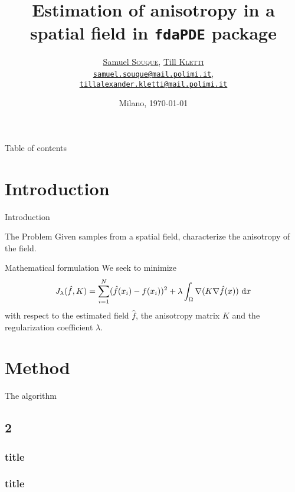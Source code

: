\documentclass[professionalfont]{beamer}
\title[Anisotropic \texttt{fdaPDE}]{Estimation of anisotropy in a spatial field in \texttt{fdaPDE} package}
\author[S. Souque \& T. Kletti]{\underline{Samuel \textsc{Souque}}, \underline{Till \textsc{Kletti}}\\
{\small \href{mailto:samuel.souque@mail.polimi.it}{\nolinkurl{samuel.souque@mail.polimi.it}}}, \\{\small \href{mailto:tillalexander.kletti@mail.polimi.it}{\nolinkurl{tillalexander.kletti@mail.polimi.it}}}}
\date[MI, today]{Milano, \today}
\institute[POLIMI]{Politecnico di Milano}
\begin{document}
\begin{frame}[plain]
\titlepage
\end{frame}

\begin{frame}{Table of contents}
\tableofcontents
\end{frame}

\section{Introduction}

\begin{frame}{Introduction}
\begin{block}{The Problem}
Given samples from a spatial field, characterize the anisotropy of the field.
\end{block}
\begin{block}{Mathematical formulation}
	We seek to minimize
	\begin{equation}
		J_\lambda(\hat{f},K) = \sum_{i=1}^N (\hat{f}(x_i)-f(x_i))^2 + \lambda\int_\Omega \nabla(K\nabla\hat{f}(x)) \,\operatorname{d}\!{x}
	\end{equation}
	with respect to the estimated field $\hat{f}$, the anisotropy matrix $K$ and the regularization coefficient $\lambda$.
\end{block}
\end{frame}

\section{Method}

\begin{frame}{The algorithm}
	
\end{frame}

\subsection{2}
\begin{frame}
\frametitle{title}
\end{frame}

\begin{frame}
\frametitle{title}
\end{frame}
\end{document}
